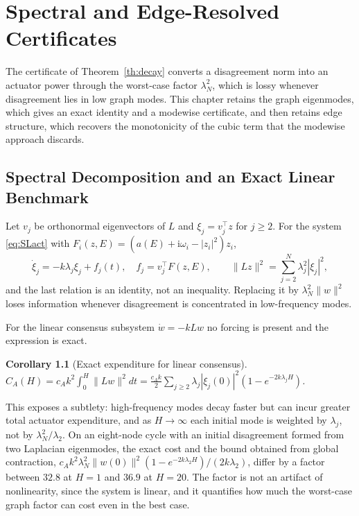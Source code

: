 \documentclass[11pt,notitlepage]{report}
\newtheorem{corollary}[theorem]{Corollary}
\theoremstyle{definition}
\theoremstyle{remark}
\newcommand{\ii}{\mathrm i}
\begin{document}
\chapter{Spectral and Edge-Resolved Certificates}\label{ch:spectral}

The certificate of Theorem~\ref{th:decay} converts a disagreement norm into an actuator power through the worst-case factor $\lambda_N^2$, which is lossy whenever disagreement lies in low graph modes. This chapter retains the graph eigenmodes, which gives an exact identity and a modewise certificate, and then retains edge structure, which recovers the monotonicity of the cubic term that the modewise approach discards.

\section{Spectral Decomposition and an Exact Linear Benchmark}
Let $v_j$ be orthonormal eigenvectors of $L$ and $\xi_j=v_j^\top z$ for $j\ge2$. For the system \eqref{eq:SLact} with $F_i(z,E)=(a(E)+\ii\omega_i-|z_i|^2)z_i$,
\begin{equation}\label{eq:modal}
\dot\xi_j=-k\lambda_j\xi_j+f_j(t),\quad f_j=v_j^\top F(z,E),\qquad \|Lz\|^2=\sum_{j=2}^N\lambda_j^2|\xi_j|^2,
\end{equation}
and the last relation is an identity, not an inequality. Replacing it by $\lambda_N^2\|w\|^2$ loses information whenever disagreement is concentrated in low-frequency modes.

For the linear consensus subsystem $\dot w=-kLw$ no forcing is present and the expression is exact.
\begin{corollary}[Exact expenditure for linear consensus]\label{cor:linear}
$C_A(H)=c_Ak^2\int_0^H\|Lw\|^2dt=\tfrac{c_Ak}2\sum_{j\ge2}\lambda_j|\xi_j(0)|^2(1-e^{-2k\lambda_jH})$.
\end{corollary}
This exposes a subtlety: high-frequency modes decay faster but can incur greater total actuator expenditure, and as $H\to\infty$ each initial mode is weighted by $\lambda_j$, not by $\lambda_N^2/\lambda_2$. On an eight-node cycle with an initial disagreement formed from two Laplacian eigenmodes, the exact cost and the bound obtained from global contraction, $c_Ak^2\lambda_N^2\|w(0)\|^2(1-e^{-2k\lambda_2H})/(2k\lambda_2)$, differ by a factor between $32.8$ at $H=1$ and $36.9$ at $H=20$. The factor is not an artifact of nonlinearity, since the system is linear, and it quantifies how much the worst-case graph factor can cost even in the best case.
\end{document}
